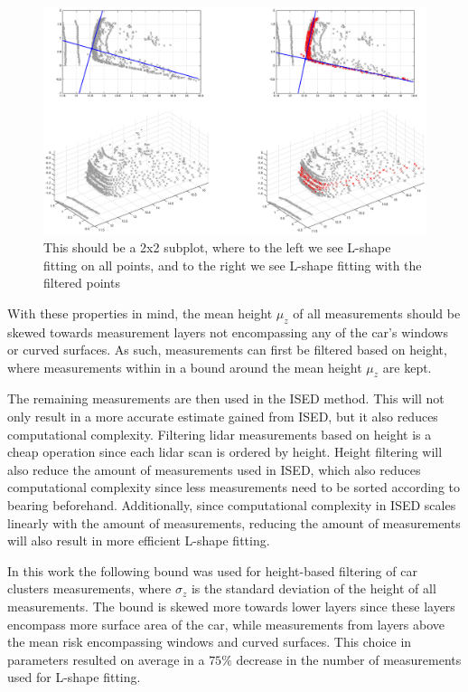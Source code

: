 \begin{figure}[ht]
    \centering
    \includegraphics[width = \linewidth]{include/images/2by2.eps}
    \caption{This should be a 2x2 subplot, where to the left we see L-shape fitting on all points, and to the right we see L-shape fitting with the filtered points}
    \label{fig:exCar}
\end{figure}

With these properties in mind, the mean height $\mu_z$ of all measurements should be skewed towards measurement layers not encompassing any of the car's windows or curved surfaces. As such, measurements can first be filtered based on height, where measurements within in a bound around the mean height $\mu_z$ are kept.

The remaining measurements are then used in the ISED method. This will not only result in a more accurate estimate gained from ISED, but it also reduces computational complexity. Filtering lidar measurements based on height is a cheap operation since each lidar scan is ordered by height. Height filtering will also reduce the amount of measurements used in ISED, which also reduces computational complexity since less measurements need to be sorted according to bearing beforehand. Additionally, since computational complexity in ISED scales linearly with the amount of measurements, reducing the amount of measurements will also result in more efficient L-shape fitting. 

In this work the following bound was used for height-based filtering of car clusters measurements, where $\sigma_z$ is the standard deviation of the height of all measurements. The bound is skewed more towards lower layers since these layers encompass more surface area of the car, while measurements from layers above the mean risk encompassing windows and curved surfaces. This choice in parameters resulted on average in a $75\%$ decrease in the number of measurements used for L-shape fitting. 

